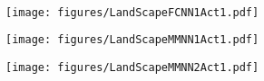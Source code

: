 \documentclass[11pt,a4paper]{article}
\begin{document}
\begin{figure}[ht]%
            \centering
            \,\hfill\begin{subfigure}[b]{0.27300245\textwidth}
                    \centering            
                    \texttt{[image: figures/LandScapeFCNN1Act1.pdf]}
                \end{subfigure}
                \hfill
            \begin{subfigure}[b]{0.27300245\textwidth}
                    \centering            \texttt{[image: figures/LandScapeMMNN1Act1.pdf]}
                \end{subfigure}
                \hfill
            \begin{subfigure}[b]{0.27300245\textwidth}
                    \centering            \texttt{[image: figures/LandScapeMMNN2Act1.pdf]}
                \end{subfigure}\hfill
                \,
                \\
                \,\hfill\begin{subfigure}[b]{0.27300245\textwidth}

\end{subfigure}
\end{figure}
\end{document}
